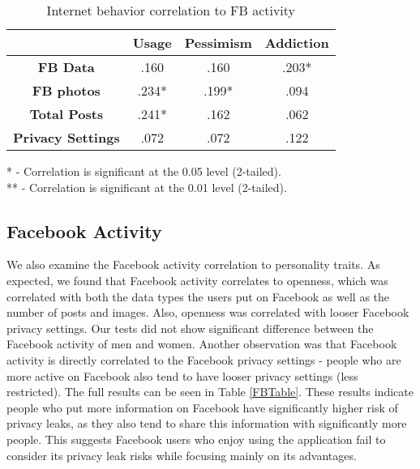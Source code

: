 \documentclass{sig-alternate}
\begin{document}
\begin{table}[htbp]
\begin{center}
\begin{tabular}{|c|c|c|c|}
\hline
&  \textbf{Usage} & \textbf{Pessimism} & \textbf{Addiction} \\
\hline
\hline
\textbf{FB Data} & .160 &	.160 &	.203*\\
\hline
\textbf{FB photos} & .234*	& .199*	& .094\\
\hline
\textbf{Total Posts} & .241* &	.162	& .062 \\
\hline
\textbf{Privacy Settings} & .072 &	.072	& .122\\
\hline

\end{tabular}

\vspace{5mm}
* - Correlation is significant at the 0.05 level (2-tailed).\\
** - Correlation is significant at the 0.01 level (2-tailed).\\

\caption{Internet behavior correlation to FB activity}
\label{InternetFB}
\end{center}
\end{table}



\subsection{Facebook Activity}

We also examine the Facebook activity correlation to personality traits.
As expected, we found that Facebook activity correlates to openness, which was correlated with both the data types the users put on Facebook as well as the number of posts and images. Also, openness was correlated with looser Facebook privacy settings. Our tests did not show significant difference between the Facebook activity of men and women. 
Another observation was that Facebook activity is directly correlated to the Facebook privacy settings -  people who are more active on Facebook also tend to have looser privacy settings (less restricted). The full results can be seen in Table \ref{FBTable}. 
These results indicate people who put more information on Facebook have significantly higher risk of privacy leaks, as they also tend to share this information with significantly more people. This suggests Facebook users who enjoy using the application fail to consider its privacy leak risks while focusing mainly on its advantages.
\end{document}
